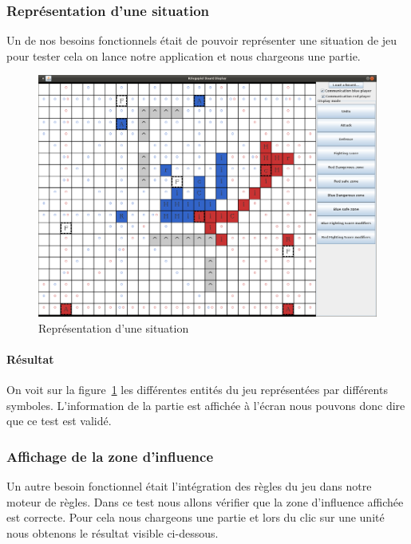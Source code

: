 			\subsubsection{Représentation d'une situation}
				Un de nos besoins fonctionnels était de pouvoir représenter une situation de jeu pour tester cela on lance notre application et nous chargeons une partie.

				\begin{figure}[!h]
				    \caption{Représentation d'une situation}
				    \centerline{\includegraphics[scale=0.35]{images/tests_fonctionnels/representation_situation.png}}
				    \label{fig:representation_situation}
				\end{figure}

				\paragraph{Résultat\\}
					On voit sur la figure~\ref{fig:representation_situation} les différentes entités du jeu représentées par différents symboles.
					L'information de la partie est affichée à l'écran nous pouvons donc dire que ce test est validé.


			\subsubsection{Affichage de la zone d'influence}
				Un autre besoin fonctionnel était l'intégration des règles du jeu dans notre moteur de règles. Dans ce test nous allons vérifier que la zone d'influence affichée est correcte. Pour cela nous chargeons une partie et lors du clic sur une unité nous obtenons le résultat visible ci-dessous.

